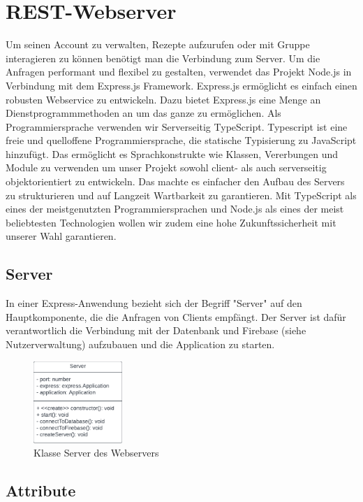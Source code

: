 \documentclass[parskip=full]{scrartcl}
\begin{document}
\section{REST-Webserver}
Um seinen Account zu verwalten, Rezepte aufzurufen oder mit Gruppe interagieren zu können benötigt man die Verbindung zum Server.
Um die Anfragen performant und flexibel zu gestalten, verwendet das Projekt Node.js in Verbindung mit dem Express.js Framework. 
Express.js ermöglicht es einfach einen robusten Webservice zu entwickeln. Dazu bietet Express.js eine Menge an Dienstprogrammmethoden an um das ganze zu ermöglichen.
Als Programmiersprache verwenden wir Serverseitig TypeScript. Typescript ist eine freie und quelloffene Programmiersprache, die statische Typisierung zu JavaScript hinzufügt.
Das ermöglicht es Sprachkonstrukte wie Klassen, Vererbungen und Module zu verwenden um unser Projekt sowohl client- als auch serverseitig objektorientiert zu entwickeln.
Das machte es einfacher den Aufbau des Servers zu strukturieren und auf Langzeit Wartbarkeit zu garantieren. Mit TypeScript als eines der meistgenutzten Programmiersprachen und Node.js als eines der meist beliebtesten Technologien wollen wir zudem eine hohe Zukunftssicherheit mit unserer Wahl garantieren.

\subsection{Server}
In einer Express-Anwendung bezieht sich der Begriff "Server" auf den Hauptkomponente, die die Anfragen von Clients empfängt.
Der Server ist dafür verantwortlich die Verbindung mit der Datenbank und Firebase (siehe Nutzerverwaltung) aufzubauen und die Application zu starten.

\begin{figure}[htp]
    \centering
    \includegraphics[width = 0.3\textwidth]{images/webserver/server.pdf}
    \caption{Klasse Server des Webservers}
    \label{fig:server}
\end{figure}

\subsection*{Attribute}
\end{document}
